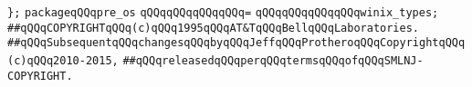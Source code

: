 \verb|};|\newline
\newline
\newline
\verb|packageqQQqpre_os|\newline
\verb|qQQqqQQqqQQqqQQq=|\newline
\verb|qQQqqQQqqQQqqQQqwinix_types;|\newline
\newline
\newline
\newline
\verb|##qQQqCOPYRIGHTqQQq(c)qQQq1995qQQqAT&TqQQqBellqQQqLaboratories.|\newline
\verb|##qQQqSubsequentqQQqchangesqQQqbyqQQqJeffqQQqProtheroqQQqCopyrightqQQq(c)qQQq2010-2015,|\newline
\verb|##qQQqreleasedqQQqperqQQqtermsqQQqofqQQqSMLNJ-COPYRIGHT.|\newline

